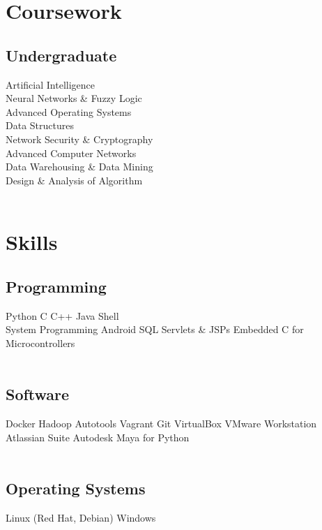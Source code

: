 \documentclass[]{deedy-resume-openfont}
\begin{document}
\begin{minipage}[t]{0.32\textwidth}
\section{Coursework}
\subsection{Undergraduate}
Artificial Intelligence \\
Neural Networks \& Fuzzy Logic \\
Advanced Operating Systems \\
Data Structures \\
Network Security \& Cryptography \\
Advanced Computer Networks \\
Data Warehousing \& Data Mining\\
Design \& Analysis of Algorithm \\
\sectionsep
\hfill \\

\section{Skills}
\subsection{Programming}
Python \textbullet{}  C \textbullet{} C++ \textbullet{} Java \textbullet{} Shell \\ 
\textbullet{} System Programming \textbullet{} Android \textbullet{} SQL \textbullet{} Servlets \& JSPs \textbullet{} Embedded C for Microcontrollers \\
\hfill \\
\subsection{Software}
 Docker \textbullet{} Hadoop \textbullet{} Autotools \textbullet{} Vagrant \textbullet{} Git \textbullet{} VirtualBox \textbullet{} VMware Workstation \textbullet{} Atlassian Suite  \textbullet{} Autodesk Maya for Python \\
\hfill \\
\subsection{Operating Systems}
\textbullet{} Linux (Red Hat, Debian) \textbullet{}  Windows \\
\sectionsep

%
%

\end{minipage} 
\end{document}
